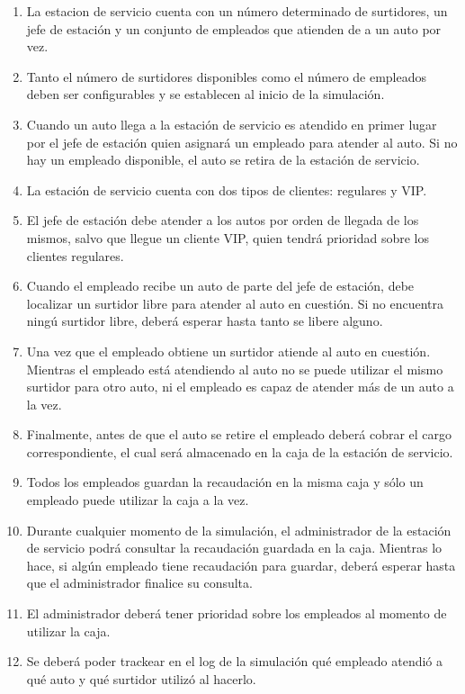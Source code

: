 \documentclass[12pt,a4paper,titlepage,oneside]{article}
\begin{document}
\begin{enumerate}
\item 
La estacion de servicio cuenta con un número determinado de surtidores, un jefe de estación y un conjunto de empleados que atienden de a un auto por vez.
\item 
Tanto el número de surtidores disponibles como el número de empleados deben ser configurables y se establecen al inicio de la simulación.
\item
Cuando un auto llega a la estación de servicio es atendido en primer lugar por el jefe de estación quien asignará un empleado para atender al auto. Si no hay un empleado disponible, el auto se retira de la estación de servicio.
\item
La estación de servicio cuenta con dos tipos de clientes: regulares y VIP.
\item
El jefe de estación debe atender a los autos por orden de llegada de los mismos, salvo que llegue un cliente VIP, quien tendrá prioridad sobre los clientes regulares.
\item
Cuando el empleado recibe un auto de parte del jefe de estación, debe localizar un surtidor libre para atender al auto en cuestión. Si no encuentra ningú surtidor libre, deberá esperar hasta tanto se libere alguno.
\item
Una vez que el empleado obtiene un surtidor atiende al auto en cuestión. Mientras el empleado está atendiendo al auto no se puede utilizar el mismo surtidor para otro auto, ni el empleado es capaz de atender más de un auto a la vez.
\item
Finalmente, antes de que el auto se retire el empleado deberá cobrar el cargo correspondiente, el cual será almacenado en la caja de la estación de servicio.
\item
Todos los empleados guardan la recaudación en la misma caja y sólo un empleado puede utilizar la caja a la vez.
\item
Durante cualquier momento de la simulación, el administrador de la estación de servicio podrá consultar la recaudación guardada en la caja. Mientras lo hace, si algún empleado tiene recaudación para guardar, deberá esperar hasta que el administrador finalice su consulta.
\item
El administrador deberá tener prioridad sobre los empleados al momento de utilizar la caja.
\item
Se deberá poder trackear en el log de la simulación qué empleado atendió a qué auto y qué surtidor utilizó al hacerlo.

\end{enumerate}
\end{document}
